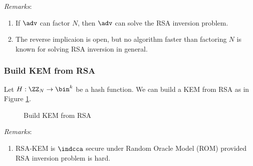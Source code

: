\documentclass[11pt,a4paper]{article}
\begin{document}
\textit{Remarks}: 
\begin{enumerate}[(1)]
\item If $\adv$ can factor $N$, then $\adv$ can solve the RSA inversion problem. 
\item The reverse implicaion is open, but no algorithm faster than factoring $N$ is known for solving RSA inversion in general. 
\end{enumerate}




\subsubsection{Build KEM from RSA}
Let $H: \ZZ_N \rightarrow \bin^k$ be a hash function. We can build a KEM from RSA as in Figure \ref{fig:rsa-kem}. 

\begin{figure}[H]
\begin{pchstack}[ center , boxed, space=0.5cm]
		
\begin{pcvstack}[space = 0.3cm]
			
\end{pcvstack}
\end{pchstack}
\caption{Build KEM from RSA}
\label{fig:rsa-kem}
\end{figure}

\textit{Remarks}: 
\begin{enumerate}
\item RSA-KEM is $\indcca$ secure under Random Oracle Model (ROM) provided RSA inversion problem is hard.  
\end{enumerate}
\end{document}

